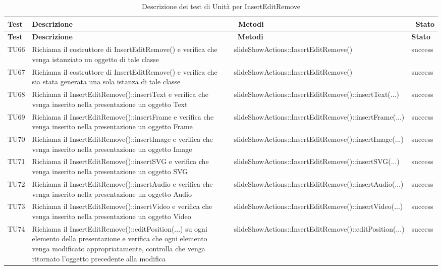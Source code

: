 		  		   \begin{longtable} [c]{| p{2cm} | p{6cm} |p{3cm} | p{2cm} |}
		 		 	 						\caption{Descrizione dei test di Unità per InsertEditRemove \label{tab:verTestUnit}}\\
		 	  		 \hline
		 	  		 \textbf{Test} & \textbf{Descrizione} & \ \textbf{Metodi} & \ \textbf{Stato} \\
		 	  		 \hline
		 	  		 \endfirsthead
		 	  		 \hline
		 	  		 \textbf{Test} & \textbf{Descrizione} & \ \textbf{Metodi} & \textbf{Stato} \\
		 	  		 \hline
		 		 	 						\endhead
		 	  		 \hline
		 	  		 \endfoot
		 	  		 \hline
		 	  		 \endlastfoot
		  		 TU66 & Richiama il costruttore di InsertEditRemove() e verifica che venga istanziato un oggetto di tale classe  & slideShowActions::InsertEditRemove() & success \\
		  		 TU67 & Richiama il costruttore di InsertEditRemove() e verifica che sia stata generata una sola istanza di tale classe  & slideShowActions::InsertEditRemove() & success \\
		 		 TU68 & Richiama il InsertEditRemove()::insertText e verifica che venga inserito nella presentazione un oggetto Text & slideShowActions::InsertEditRemove()::insertText(...) & success \\
		 		 TU69 & Richiama il InsertEditRemove()::insertFrame e verifica che venga inserito nella presentazione un oggetto Frame  & slideShowActions::InsertEditRemove()::insertFrame(...) & success \\
		 		 TU70 & Richiama il InsertEditRemove()::insertImage e verifica che venga inserito nella presentazione un oggetto Image  & slideShowActions::InsertEditRemove()::insertImage(...) & success \\
		 		 TU71 & Richiama il InsertEditRemove()::insertSVG e verifica che venga inserito nella presentazione un oggetto SVG  & slideShowActions::InsertEditRemove()::insertSVG(...) & success \\
		 		 TU72 & Richiama il InsertEditRemove()::insertAudio e verifica che venga inserito nella presentazione un oggetto Audio  & slideShowActions::InsertEditRemove()::insertAudio(...) & success \\
		 		 TU73 & Richiama il InsertEditRemove()::insertVideo e verifica che venga inserito nella presentazione un oggetto Video  & slideShowActions::InsertEditRemove()::insertVideo(...) & success \\
		 		 TU74 & Richiama il InsertEditRemove()::editPosition(...) su ogni elemento della presentazione e verifica che ogni elemento venga modificato appropriatamente, controlla che venga ritornato l'oggetto precedente alla modifica   & slideShowActions::InsertEditRemove()::editPosition(...) & success \\

\end{longtable}
